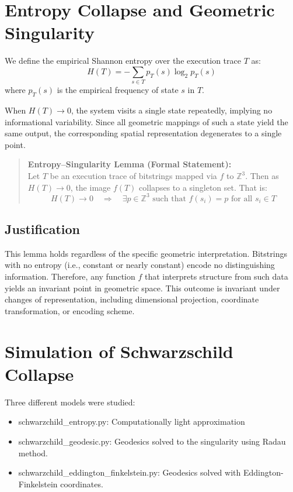 \documentclass[11pt]{article}
\begin{document}
\section{Entropy Collapse and Geometric Singularity}

We define the empirical Shannon entropy over the execution trace $T$ as:
\[
  H(T) = -\sum_{s \in T} p_T(s) \log_2 p_T(s)
\]
where $p_T(s)$ is the empirical frequency of state $s$ in $T$.

When $H(T) \to 0$, the system visits a single state repeatedly, implying no informational variability. Since all geometric mappings of such a state yield the same output, the corresponding spatial representation degenerates to a single point.

\begin{quote}
  \textbf{Entropy--Singularity Lemma (Formal Statement):} \\
  Let $T$ be an execution trace of bitstrings mapped via $f$ to $\mathbb{Z}^3$. Then as $H(T) \to 0$, the image $f(T)$ collapses to a singleton set. That is:
  \[
    H(T) \to 0 \quad \Rightarrow \quad \exists p \in \mathbb{Z}^3 \text{ such that } f(s_i) = p \text{ for all } s_i \in T
  \]
\end{quote}

\subsection*{Justification}

This lemma holds regardless of the specific geometric interpretation. Bitstrings with no entropy (i.e., constant or nearly constant) encode no distinguishing information. Therefore, any function $f$ that interprets structure from such data yields an invariant point in geometric space. This outcome is invariant under changes of representation, including dimensional projection, coordinate transformation, or encoding scheme.

\section{Simulation of Schwarzschild Collapse}

Three different models were studied:
\begin{itemize}
  \item schwarzchild\_entropy.py: Computationally light approximation
  \item schwarzchild\_geodesic.py: Geodesics solved to the singularity using Radau method.
  \item schwarzchild\_eddington\_finkelstein.py: Geodesics solved with Eddington-Finkelstein coordinates.
\end{itemize}
\end{document}
